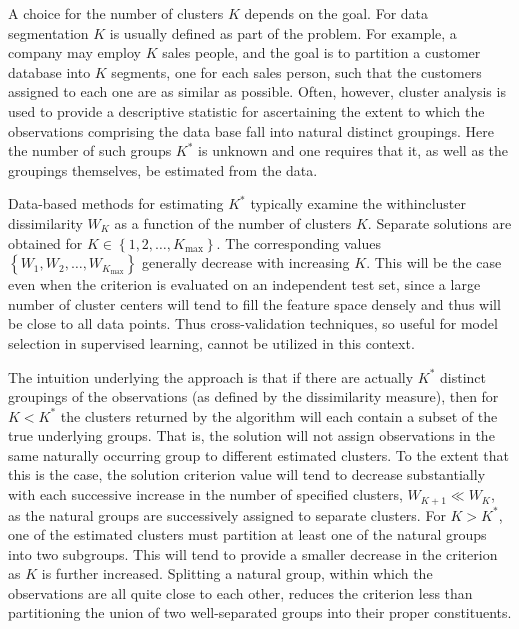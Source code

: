 \documentclass[10pt]{article}
\begin{document}
A choice for the number of clusters $K$ depends on the goal. For data segmentation $K$ is usually defined as part of the problem. For example, a company may employ $K$ sales people, and the goal is to partition a customer database into $K$ segments, one for each sales person, such that the customers assigned to each one are as similar as possible. Often, however, cluster analysis is used to provide a descriptive statistic for ascertaining the extent to which the observations comprising the data base fall into natural distinct groupings. Here the number of such groups $K^{*}$ is unknown and one requires that it, as well as the groupings themselves, be estimated from the data.

Data-based methods for estimating $K^{*}$ typically examine the withincluster dissimilarity $W_{K}$ as a function of the number of clusters $K$. Separate solutions are obtained for $K \in\left\{1,2, \ldots, K_{\max }\right\}$. The corresponding values\\
$\left\{W_{1}, W_{2}, \ldots, W_{K_{\max }}\right\}$ generally decrease with increasing $K$. This will be the case even when the criterion is evaluated on an independent test set, since a large number of cluster centers will tend to fill the feature space densely and thus will be close to all data points. Thus cross-validation techniques, so useful for model selection in supervised learning, cannot be utilized in this context.

The intuition underlying the approach is that if there are actually $K^{*}$ distinct groupings of the observations (as defined by the dissimilarity measure), then for $K<K^{*}$ the clusters returned by the algorithm will each contain a subset of the true underlying groups. That is, the solution will not assign observations in the same naturally occurring group to different estimated clusters. To the extent that this is the case, the solution criterion value will tend to decrease substantially with each successive increase in the number of specified clusters, $W_{K+1} \ll W_{K}$, as the natural groups are successively assigned to separate clusters. For $K>K^{*}$, one of the estimated clusters must partition at least one of the natural groups into two subgroups. This will tend to provide a smaller decrease in the criterion as $K$ is further increased. Splitting a natural group, within which the observations are all quite close to each other, reduces the criterion less than partitioning the union of two well-separated groups into their proper constituents.
\end{document}
